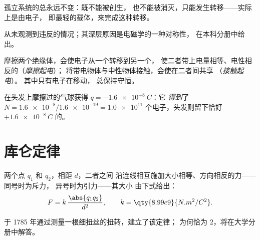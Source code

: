 \begin{proposition}[电荷守恒]\label{prop:g11:fundamental-interactions:conservation}
孤立系统的总永远不变：既不能被创生，
也不能被消灭，只能发生转移——实际上是由电子，
即最轻的载体，来完成这种转移。
\end{proposition}
\admitted

\begin{remark}\label{rem:g11:fundamental-interactions:conservation}
从未观测到违反的情况；其深层原因是电磁学的一种对称性，
在本科分册中给出。
\end{remark}

\begin{definition}[摩擦起电与接触起电]\label{def:g11:fundamental-interactions:charging}
摩擦两个绝缘体，会使电子从一个转移到另一个，
使二者带上电量相等、电性相反的（\emph{摩擦起电}）；
将带电物体与中性物体接触，会使在二者间共享
（\emph{接触起电}）。
其中只有电子在移动，
总保持守恒。
\end{definition}

\begin{example}[计算电子个数]\label{ex:g11:fundamental-interactions:balloon}
在头发上摩擦过的气球获得 $q = \qty{-1.6e-8}{C}$：它
\emph{得到}了 $N = \num{1.6e-8} / \num{1.6e-19} = \num{1.0e11}$
个电子，头发则留下恰好 $+\qty{1.6e-8}{C}$ 的。
\end{example}

\section{库仑定律}

\begin{theorem}[库仑定律]\label{thm:g11:fundamental-interactions:coulomb}
两个点 $q_1$ 和 $q_2$，相距 $d$，二者之间
沿连线相互施加大小相等、方向相反的力——同号时为斥力，
异号时为引力——其大小
由下式给出：
\[
F = k\,\frac{\abs{q_1 q_2}}{d^{2}},
\qquad k = \qty{8.99e9}{N.m^2/C^2}.
\]
\end{theorem}
\admitted

\begin{remark}\label{rem:g11:fundamental-interactions:torsion}
于 1785 年通过测量一根细扭丝的扭转，建立了该定律；
为何恰为 $2$，将在大学分册中解答。
\end{remark}


